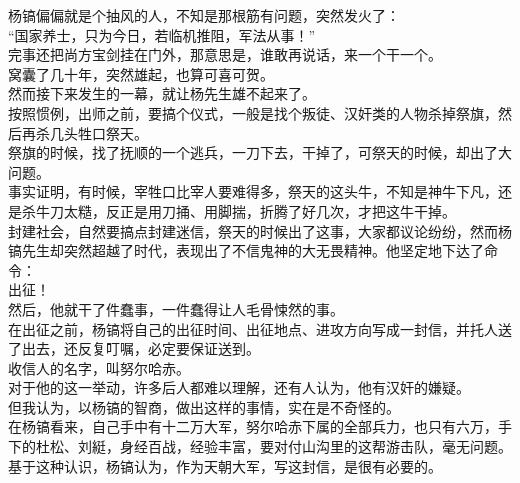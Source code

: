 \begin{multicols}{\theparacolNo}
杨镐偏偏就是个抽风的人，不知是那根筋有问题，突然发火了：\\

“国家养士，只为今日，若临机推阻，军法从事！”\\

完事还把尚方宝剑挂在门外，那意思是，谁敢再说话，来一个干一个。\\

窝囊了几十年，突然雄起，也算可喜可贺。\\

然而接下来发生的一幕，就让杨先生雄不起来了。\\

按照惯例，出师之前，要搞个仪式，一般是找个叛徒、汉奸类的人物杀掉祭旗，然后再杀几头牲口祭天。\\

祭旗的时候，找了抚顺的一个逃兵，一刀下去，干掉了，可祭天的时候，却出了大问题。\\

事实证明，有时候，宰牲口比宰人要难得多，祭天的这头牛，不知是神牛下凡，还是杀牛刀太糙，反正是用刀捅、用脚揣，折腾了好几次，才把这牛干掉。\\

封建社会，自然要搞点封建迷信，祭天的时候出了这事，大家都议论纷纷，然而杨镐先生却突然超越了时代，表现出了不信鬼神的大无畏精神。他坚定地下达了命令：\\

出征！\\

然后，他就干了件蠢事，一件蠢得让人毛骨悚然的事。\\

在出征之前，杨镐将自己的出征时间、出征地点、进攻方向写成一封信，并托人送了出去，还反复叮嘱，必定要保证送到。\\

收信人的名字，叫努尔哈赤。\\

对于他的这一举动，许多后人都难以理解，还有人认为，他有汉奸的嫌疑。\\

但我认为，以杨镐的智商，做出这样的事情，实在是不奇怪的。\\

在杨镐看来，自己手中有十二万大军，努尔哈赤下属的全部兵力，也只有六万，手下的杜松、刘綎，身经百战，经验丰富，要对付山沟里的这帮游击队，毫无问题。\\

基于这种认识，杨镐认为，作为天朝大军，写这封信，是很有必要的。\\


\end{multicols}
